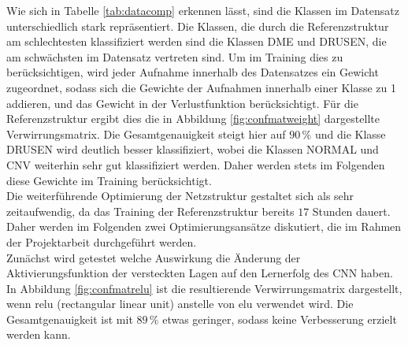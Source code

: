 \setcounter{subfigure}{0} 
Wie sich in Tabelle \ref{tab:datacomp} erkennen lässt, sind die Klassen im Datensatz unterschiedlich stark repräsentiert. Die Klassen, die durch die Referenzstruktur am schlechtesten klassifiziert werden sind die Klassen DME und DRUSEN, die am schwächsten im Datensatz vertreten sind. Um im Training dies zu berücksichtigen, wird jeder Aufnahme innerhalb des Datensatzes ein Gewicht zugeordnet, sodass sich die Gewichte der Aufnahmen innerhalb einer Klasse zu 1 addieren, und das Gewicht in der Verlustfunktion berücksichtigt. Für die Referenzstruktur ergibt dies die in Abbildung \ref{fig:confmatweight} dargestellte Verwirrungsmatrix. Die Gesamtgenauigkeit steigt hier auf $90\,\%$ und die Klasse DRUSEN wird deutlich besser klassifiziert, wobei die Klassen NORMAL und CNV weiterhin sehr gut klassifiziert werden. Daher werden stets im Folgenden diese Gewichte im Training berücksichtigt.  \\ 
Die weiterführende Optimierung der Netzstruktur gestaltet sich als sehr zeitaufwendig, da das Training der Referenzstruktur bereits $17$ Stunden dauert. Daher werden im Folgenden zwei Optimierungsansätze diskutiert, die im Rahmen der Projektarbeit durchgeführt werden. \\
Zunächst wird getestet welche Auswirkung die Änderung der Aktivierungsfunktion der versteckten Lagen auf den Lernerfolg des CNN haben. In Abbildung \ref{fig:confmatrelu} ist die resultierende Verwirrungsmatrix dargestellt, wenn relu (rectangular linear unit) anstelle von elu verwendet wird. Die Gesamtgenauigkeit ist mit $89\,\%$ etwas geringer, sodass keine Verbesserung erzielt werden kann.  \\
